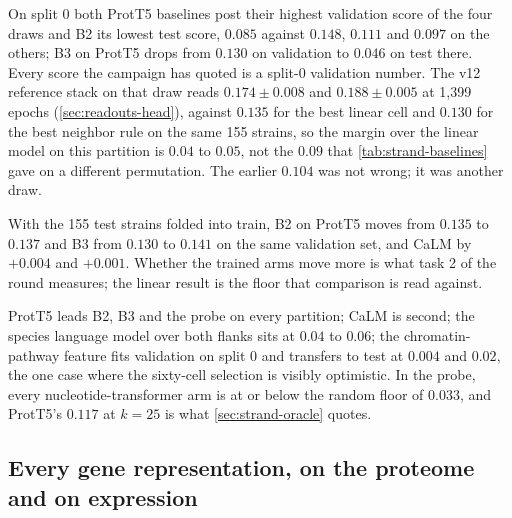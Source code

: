  On split 0 both
ProtT5 baselines post their highest validation score of the four draws and B2 its lowest
test score, $0.085$ against $0.148$, $0.111$ and $0.097$ on the others; B3 on ProtT5 drops
from $0.130$ on validation to $0.046$ on test there. Every score the campaign has quoted is
a split-0 validation number. The v12 reference stack on that draw reads $0.174 \pm 0.008$
and  $0.188 \pm 0.005$ at 1{,}399 epochs (\cref{sec:readouts-head}), against
$0.135$ for the best linear cell and $0.130$ for the best neighbor rule on the same 155
strains, so the margin over the linear model on this partition is $0.04$ to $0.05$, not the
$0.09$ that \cref{tab:strand-baselines} gave on a different permutation. The earlier
$0.104$ was not wrong; it was another draw.

 With the 155
test strains folded into train, B2 on ProtT5 moves from $0.135$ to $0.137$ and B3 from
$0.130$ to $0.141$ on the same validation set, and CaLM by $+0.004$ and $+0.001$. Whether
the trained arms move more is what task 2 of the round measures; the linear result is the
floor that comparison is read against.

 ProtT5 leads B2, B3 and the probe on
every partition; CaLM is second; the species language model over both flanks sits at
$0.04$ to $0.06$; the chromatin-pathway feature fits validation on split 0 and transfers to
test at $0.004$ and $0.02$, the one case where the sixty-cell selection is visibly
optimistic. In the probe, every nucleotide-transformer arm is at or below the random floor
of $0.033$, and ProtT5's $0.117$ at $k = 25$ is what \cref{sec:strand-oracle} quotes.

\subsection{Every gene representation, on the proteome and on expression}
\label{sec:baselines-embedding-study}


